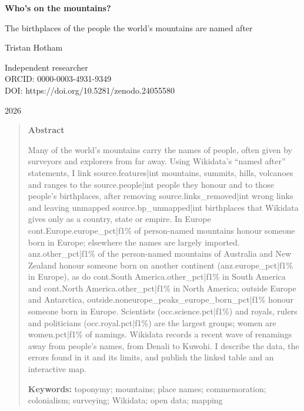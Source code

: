 \documentclass[11pt,a4paper]{article}
\begin{document}
\begin{center}
{\Large\bfseries Who's on the mountains?\par}
\vspace{0.4em}
{\large The birthplaces of the people the world's mountains are named after\par}
\vspace{1.2em}
{\large Tristan Hotham\par}
\vspace{0.3em}
{\small Independent researcher\\
ORCID: 0000-0003-4931-9349\\
DOI: https://doi.org/10.5281/zenodo.24055580\par}
\vspace{0.8em}
2026
\end{center}

\begin{quote}
\small
\begin{center}\textbf{Abstract}\end{center}
Many of the world's mountains carry the names of people, often given by surveyors and explorers from far away. Using Wikidata's ``named after'' statements, I link {{source.features|int}} mountains, summits, hills, volcanoes and ranges to the {{source.people|int}} people they honour and to those people's birthplaces, after removing {{source.links_removed|int}} wrong links and leaving unmapped {{source.bp_unmapped|int}} birthplaces that Wikidata gives only as a country, state or empire. In Europe {{cont.Europe.europe_pct|f1}}\% of person-named mountains honour someone born in Europe; elsewhere the names are largely imported. {{anz.other_pct|f1}}\% of the person-named mountains of Australia and New Zealand honour someone born on another continent ({{anz.europe_pct|f1}}\% in Europe), as do {{cont.South America.other_pct|f1}}\% in South America and {{cont.North America.other_pct|f1}}\% in North America; outside Europe and Antarctica, {{outside.noneurope_peaks_europe_born_pct|f1}}\% honour someone born in Europe. Scientists ({{occ.science.pct|f1}}\%) and royals, rulers and politicians ({{occ.royal.pct|f1}}\%) are the largest groups; women are {{women.pct|f1}}\% of namings. Wikidata records a recent wave of renamings away from people's names, from Denali to Kuwohi. I describe the data, the errors found in it and its limits, and publish the linked table and an interactive map.

\textbf{Keywords:} toponymy; mountains; place names; commemoration; colonialism; surveying; Wikidata; open data; mapping
\end{quote}
\end{document}

